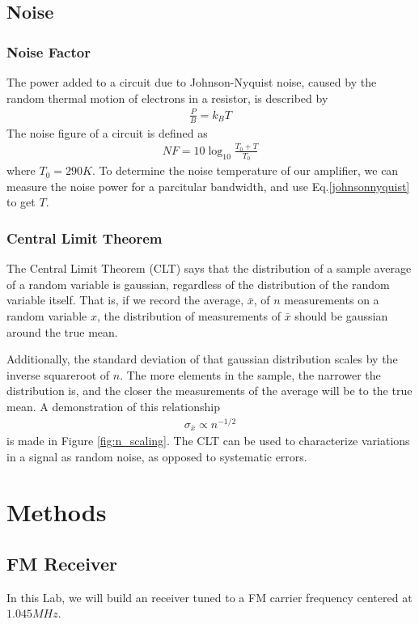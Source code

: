 \documentclass[12pt]{article}
\begin{document}
\subsection*{Noise}
\subsubsection*{Noise Factor}
The power added to a circuit due to Johnson-Nyquist noise, caused by the random thermal motion of electrons in a resistor, is described by
\begin{eqnarray}
\frac{P}{B} = k_B T \label{johnsonnyquist}
\end{eqnarray}
The noise figure of a circuit is defined as
\begin{eqnarray}
NF = 10\log_{10}{\frac{T_0 + T}{T_0}} \label{eq:noisefigure}
\end{eqnarray}
where $T_0=290K$. To determine the noise temperature of our amplifier, we can measure the noise power for a parcitular bandwidth, and use Eq.\ref{johnsonnyquist} to get $T$.

\subsubsection*{Central Limit Theorem}
The Central Limit Theorem (CLT) says that the distribution of a sample average of a random variable is gaussian, regardless of the distribution of the random variable itself. That is, if we record the average, $\bar{x}$, of $n$ measurements on a random variable $x$, the distribution of measurements of $\bar{x}$ should be gaussian around the true mean.

Additionally, the standard deviation of that gaussian distribution scales by the inverse squareroot of $n$. The more elements in the sample, the narrower the distribution is, and the closer the measurements of the average will be to the true mean. A demonstration of this relationship
\begin{eqnarray}
\sigma_{\bar{x}} \propto n^{-1/2} \label{eq:rootn}
\end{eqnarray}
is made in Figure \ref{fig:n_scaling}. The CLT can be used to characterize variations in a signal as random noise, as opposed to systematic errors.
\newpage
\section*{Methods}

\subsection*{FM Receiver}
In this Lab, we will build an receiver tuned to a FM carrier frequency centered at $1.045MHz$.
\end{document}
